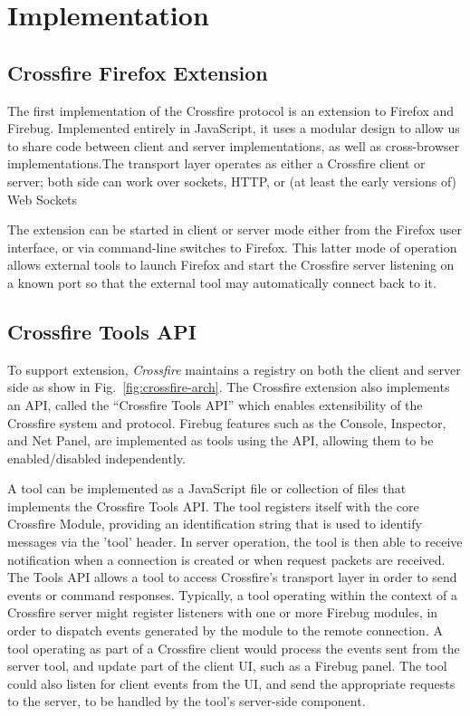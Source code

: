 \section{Implementation}

\subsection{Crossfire Firefox Extension}
The first implementation of the Crossfire protocol is an extension to Firefox and Firebug.
Implemented entirely in JavaScript, it uses a modular design to allow us to share
code between client and server implementations, as well as cross-browser
implementations.The transport layer operates as either a Crossfire client or server; 
both side can work over sockets,  HTTP, or (at least the early versions of) Web Sockets 

The extension can be started in client or server mode either from the Firefox
user interface, or via command-line switches to Firefox. This latter mode of
operation allows external tools to launch Firefox and start the Crossfire server
listening on a known port so that the external tool may automatically connect
back to it. 


\subsection{Crossfire Tools API}
To support extension, \textit{Crossfire} maintains a registry on both the client 
and server side as show in Fig.~\ref{fig:crossfire-arch}.
The Crossfire extension also implements an API, called the ``Crossfire Tools
API'' which enables extensibility of the Crossfire system and protocol. Firebug
features such as the Console, Inspector, and Net Panel, are implemented as tools
using the API, allowing them to be enabled/disabled independently.

A tool can be implemented as a JavaScript file or collection of files that
implements the Crossfire Tools API. The tool registers itself with the core
Crossfire Module, providing an identification string that is used to identify
messages via the 'tool' header. In server operation, the tool is then able to
receive notification when a connection is created or when request packets are
received. The Tools API allows a tool to access Crossfire's transport layer in
order to send events or command responses.  Typically, a tool operating within
the context of a Crossfire server might register listeners with one or more
Firebug modules, in order to dispatch events generated by the module to the
remote connection. A tool operating as part of a Crossfire client would process
the events sent from the server tool, and update part of the client UI, such as
a Firebug panel. The tool could also listen for client events from the UI, and
send the appropriate requests to the server, to be handled by the tool's
server-side component.

